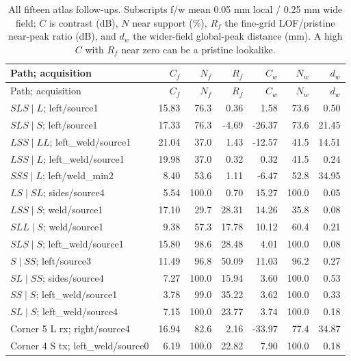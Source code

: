 \begingroup\small\setlength{\tabcolsep}{3pt}
\begin{longtable}{@{}>{\raggedright\arraybackslash}p{.34\linewidth}rrrrrr@{}}
\caption{All fifteen atlas follow-ups. Subscripts f/w mean 0.05 mm local / 0.25 mm wide field; $C$ is contrast (dB), $N$ near support (\%), $R_f$ the fine-grid LOF/pristine near-peak ratio (dB), and $d_w$ the wider-field global-peak distance (mm). A high $C$ with $R_f$ near zero can be a pristine lookalike.}\label{saftapp:path_confirmation}\\
\toprule Path; acquisition & $C_f$ & $N_f$ & $R_f$ & $C_w$ & $N_w$ & $d_w$\\\midrule\endfirsthead
\toprule Path; acquisition & $C_f$ & $N_f$ & $R_f$ & $C_w$ & $N_w$ & $d_w$\\\midrule\endhead
$SLS\mid L$; left/source1 & 15.83 & 76.3 & 0.36 & 1.58 & 73.6 & 0.50\\
$SLS\mid S$; left/source1 & 17.33 & 76.3 & -4.69 & -26.37 & 73.6 & 21.45\\
$LSS\mid LL$; left\_\allowbreak weld/source1 & 21.04 & 37.0 & 1.43 & -12.57 & 41.5 & 14.51\\
$LSS\mid L$; left\_\allowbreak weld/source1 & 19.98 & 37.0 & 0.32 & 0.32 & 41.5 & 0.24\\
$SSS\mid L$; left/weld\_\allowbreak min2 & 8.40 & 53.6 & 1.11 & -6.47 & 52.8 & 34.95\\
$LS\mid SL$; sides/source4 & 5.54 & 100.0 & 0.70 & 15.27 & 100.0 & 0.05\\
$LSS\mid S$; weld/source1 & 17.10 & 29.7 & 28.31 & 14.26 & 35.8 & 0.08\\
$SLL\mid S$; weld/source1 & 9.38 & 57.3 & 17.78 & 10.12 & 60.4 & 0.21\\
$SLS\mid S$; left\_\allowbreak weld/source1 & 15.80 & 98.6 & 28.48 & 4.01 & 100.0 & 0.08\\
$S\mid SS$; left/source3 & 11.49 & 96.8 & 50.09 & 11.03 & 96.2 & 0.27\\
$SL\mid SS$; sides/source4 & 7.27 & 100.0 & 15.94 & 3.60 & 100.0 & 0.53\\
$SS\mid S$; left\_\allowbreak weld/source1 & 3.78 & 99.0 & 35.22 & 3.62 & 100.0 & 0.33\\
$SL\mid S$; left\_\allowbreak weld/source4 & 7.15 & 100.0 & 23.77 & 3.74 & 100.0 & 0.18\\
Corner 5 L rx; right/source4 & 16.94 & 82.6 & 2.16 & -33.97 & 77.4 & 34.87\\
Corner 4 S tx; left\_\allowbreak weld/source0 & 6.19 & 100.0 & 22.82 & 7.90 & 100.0 & 0.18\\
\bottomrule\end{longtable}\endgroup

